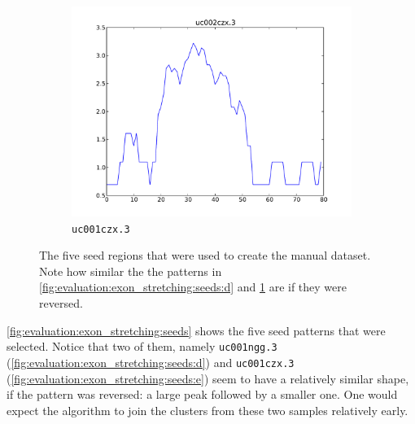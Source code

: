 \documentclass[parskip]{cs4rep}
\newcommand{\gene}[1]{{\tt #1}}
\begin{document}
\begin{figure}[t,b]
\begin{subfigure}[b]{0.3\textwidth}
        \centering
        \includegraphics[width=\textwidth]{figures/evaluation/exon_stretching/uc002czx_3.pdf}
        \caption{\gene{uc001czx.3}}
        \label{fig:evaluation:exon_stretching:seeds:e}
    \end{subfigure}
    \caption{The five seed regions that were used to create the manual dataset. Note how similar the the patterns in \ref{fig:evaluation:exon_stretching:seeds:d} and \ref{fig:evaluation:exon_stretching:seeds:e} are if they were reversed.}
    \label{fig:evaluation:exon_stretching:seeds}
\end{figure}

\autoref{fig:evaluation:exon_stretching:seeds} shows the five seed patterns that were selected. 
Notice that two of them, namely \gene{uc001ngg.3} (\autoref{fig:evaluation:exon_stretching:seeds:d}) and \gene{uc001czx.3} (\autoref{fig:evaluation:exon_stretching:seeds:e}) seem to have a relatively similar shape, if the pattern was reversed: a large peak followed by a smaller one. One would expect the algorithm to join the clusters from these two samples relatively early.
\end{document}

